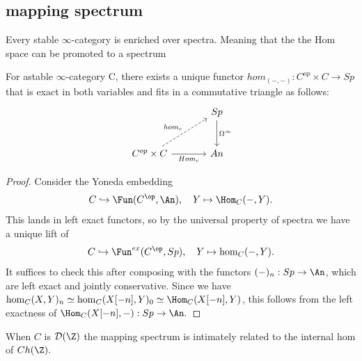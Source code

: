\subsection{mapping spectrum}
Every stable $\infty$-category is enriched over spectra. Meaning that the the Hom space can be promoted to a spectrum
\begin{proposition}
    For astable $\infty$-category C, there exists a unique functor
$hom_(-,-): C^{op} \times C\to Sp$
that is exact in both variables and fits in a commutative triangle as follows:
\[\begin{tikzcd}[sep=scriptsize]
	&& Sp \\
	\\
	{C^{op}\times C} && An
	\arrow["{\Omega^\infty}", from=1-3, to=3-3]
	\arrow["{hom_c}", dashed, from=3-1, to=1-3]
	\arrow["{Hom_c}"', from=3-1, to=3-3]
\end{tikzcd}\]
\end{proposition}
\begin{proof}
     Consider the Yoneda embedding
     \[C\hookrightarrow \Fun(C^{\op},\An),\quad Y\mapsto\Hom_C(-,Y).\]
This lands in left exact functors, so by the universal property of spectra we have a unique lift of 
\[C\hookrightarrow\Fun^{ex}(C^{\op},Sp), \quad Y\mapsto\hom_C(-,Y).\] It suffices to check this after composing with
the functors $(-)_n: Sp \to \An$, which are left exact and jointly conservative. Since we have
$\hom_C (X, Y)_n\simeq\hom_C (X[-n], Y)_0 \simeq \Hom_C (X[-n], Y)$, this follows from the left exactness of
$\Hom_C (X[-n], -): Sp \to \An.$


\end{proof}


\begin{remark}
    When $C$ is $\mathcal{D(\Z)}$ the mapping spectrum is intimately related to the internal hom of $Ch(\Z).$
\end{remark}
